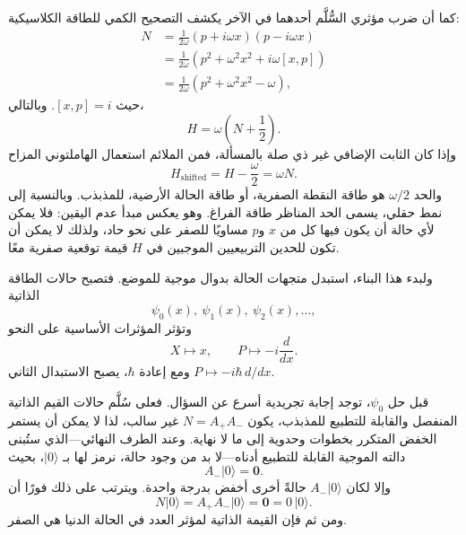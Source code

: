 كما أن ضرب مؤثري السُّلَّم أحدهما في الآخر يكشف التصحيح الكمي للطاقة الكلاسيكية:
\begin{align}
N
&=\frac{1}{2\omega}(p+i\omega x)(p-i\omega x)\\
&=\frac{1}{2\omega}\left(p^{2}+\omega^{2}x^{2}
 +i\omega[x,p]\right)\\
&=\frac{1}{2\omega}\left(p^{2}+\omega^{2}x^{2}-\omega\right),
\end{align}
حيث \([x,p]=i\). وبالتالي،
\begin{equation}
H=\omega\left(N+\frac12\right).
\end{equation}
وإذا كان الثابت الإضافي غير ذي صلة بالمسألة، فمن الملائم استعمال الهاملتوني المزاح
\begin{equation}
H_{\mathrm{shifted}}=H-\frac{\omega}{2}=\omega N.
\end{equation}
والحد \(\omega/2\) هو طاقة النقطة الصفرية، أو طاقة الحالة الأرضية، للمذبذب. وبالنسبة إلى نمط حقلي، يسمى الحد المناظر طاقة الفراغ. وهو يعكس مبدأ عدم اليقين: فلا يمكن لأي حالة أن يكون فيها كل من \(x\) و\(p\) مساويًا للصفر على نحو حاد، ولذلك لا يمكن أن تكون للحدين التربيعيين الموجبين في \(H\) قيمة توقعية صفرية معًا.

\begin{classroomqa}
\end{classroomqa}

ولبدء هذا البناء، استبدل متجهات الحالة بدوال موجية للموضع. فتصبح حالات الطاقة الذاتية
\[
\psi_{0}(x),\ \psi_{1}(x),\ \psi_{2}(x),\ldots,
\]
وتؤثر المؤثرات الأساسية على النحو
\begin{equation}
X\longmapsto x,\qquad
P\longmapsto -i\frac{d}{dx}.
\end{equation}
ومع إعادة \(\hbar\)، يصبح الاستبدال الثاني
\(P\mapsto-i\hbar\,d/dx\).

قبل حل \(\psi_{0}\)، توجد إجابة تجريدية أسرع عن السؤال. فعلى سُلَّم حالات القيم الذاتية المنفصل والقابلة للتطبيع للمذبذب، يكون \(N=A_{+}A_{-}\) غير سالب، لذا لا يمكن أن يستمر الخفض المتكرر بخطوات وحدوية إلى ما لا نهاية. وعند الطرف النهائي---الذي ستُبنى دالته الموجية القابلة للتطبيع أدناه---لا بد من وجود حالة، نرمز لها بـ \(\lvert0\rangle\)، بحيث
\begin{equation}
A_{-}\lvert0\rangle=\mathbf 0.
\end{equation}
وإلا لكان \(A_{-}\lvert0\rangle\) حالةً أخرى أخفض بدرجة واحدة. ويترتب على ذلك فورًا أن
\begin{equation}
N\lvert0\rangle
=A_{+}A_{-}\lvert0\rangle
=\mathbf 0
=0\,\lvert0\rangle.
\end{equation}
ومن ثم فإن القيمة الذاتية لمؤثر العدد في الحالة الدنيا هي الصفر.


